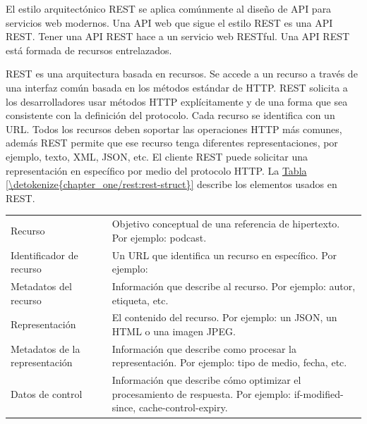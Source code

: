 El estilo arquitectónico REST se aplica comúnmente al diseño de API para
servicios web modernos. Una API web que sigue el estilo REST es una API REST.
Tener una API REST hace a un servicio web RESTful. Una API REST está formada de
recursos entrelazados.\\

\begin{remark}
REST es una arquitectura basada en recursos. Se accede a un recurso a través
de una interfaz común basada en los métodos estándar de HTTP. REST
solicita a los desarrolladores usar métodos HTTP explícitamente
y de una forma que sea consistente con la definición del protocolo.
Cada recurso se identifica con un URL. Todos los recursos deben soportar
las operaciones HTTP más comunes, además REST permite que ese recurso
tenga diferentes representaciones, por ejemplo, texto, XML, JSON, etc.
El cliente REST puede solicitar una representación en específico por
medio del protocolo HTTP. La \hyperref[\detokenize{chapter_one/rest:rest-struct}]{Tabla \ref{\detokenize{chapter_one/rest:rest-struct}}} describe
los elementos usados en REST.
\end{remark}


\begin{savenotes}\sphinxattablestart
\centering
{}
\sphinxaftercaption
\begin{tabulary}{\linewidth}[t]{|T|T|}
\hline
{}\relax &\relax \\
\hline
Recurso
&
Objetivo conceptual de una referencia de hipertexto. Por ejemplo: podcast.
\\
\hline
Identificador de recurso
&
Un URL que identifica un recurso en específico. Por ejemplo: 
\\
\hline
Metadatos del recurso
&
Información que describe al recurso. Por ejemplo: autor, etiqueta, etc.
\\
\hline
Representación
&
El contenido del recurso. Por ejemplo: un JSON, un HTML o una imagen JPEG.
\\
\hline
Metadatos de la representación
&
Información que describe como procesar la representación. Por ejemplo: tipo de medio, fecha, etc.
\\
\hline
Datos de control
&
Información que describe cómo optimizar el procesamiento de respuesta. Por ejemplo: if-modified-since, cache-control-expiry.
\\
\hline
\end{tabulary}
\par
\sphinxattableend\end{savenotes}

